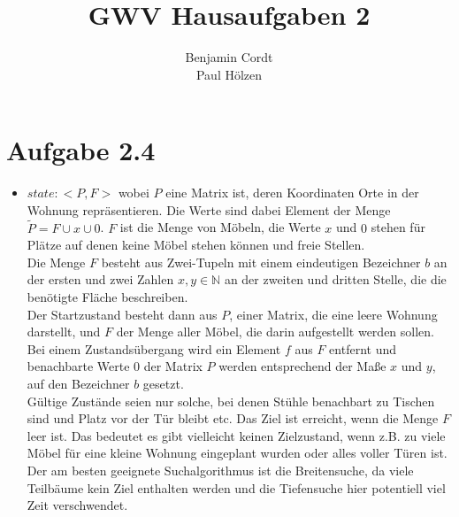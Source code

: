 \documentclass[12pt, paper=a4]{article}
\author{Benjamin Cordt\\Paul Hölzen}
\title{GWV Hausaufgaben 2}
\begin{document}
\maketitle

\section*{Aufgabe 2.4}
\begin{itemize}
\item $state: <P,F>$ wobei $P$ eine Matrix ist, deren Koordinaten Orte in der Wohnung repräsentieren.
    Die Werte sind dabei Element der Menge $\tilde{P} = F \cup x \cup 0$.
      $F$ ist die Menge von Möbeln, die Werte $x$ und $0$ stehen für Plätze auf denen keine
      Möbel stehen können und freie Stellen.\\
      Die Menge $F$ besteht aus Zwei-Tupeln mit einem eindeutigen Bezeichner $b$ an der ersten
      und zwei Zahlen $x, y \in \mathbb{N}$ an der zweiten und dritten Stelle, die die benötigte
      Fläche beschreiben.\\
      
      Der Startzustand besteht dann aus $P$, einer Matrix, die eine leere Wohnung darstellt, und
      $F$ der Menge aller Möbel, die darin aufgestellt werden sollen. Bei einem Zustandsübergang
      wird ein Element $f$ aus $F$ entfernt und benachbarte Werte $0$ der Matrix $P$ werden
      entsprechend der Maße $x$ und $y$, auf den Bezeichner $b$ gesetzt.\\
      Gültige Zustände seien nur solche, bei denen Stühle benachbart zu Tischen sind und Platz
      vor der Tür bleibt etc. Das Ziel ist erreicht, wenn die Menge $F$ leer ist. Das bedeutet es
      gibt vielleicht keinen Zielzustand, wenn z.B. zu viele Möbel für eine kleine Wohnung eingeplant
      wurden oder alles voller Türen ist.\\
      Der am besten geeignete Suchalgorithmus ist die Breitensuche, da viele Teilbäume kein Ziel
      enthalten werden und die Tiefensuche hier potentiell viel Zeit verschwendet.


\end{itemize}
\end{document}
